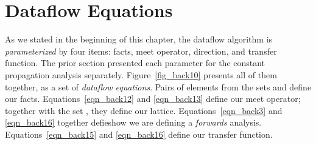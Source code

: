 \documentclass[12pt]{report}
\begin{document}








\section{Dataflow Equations}
\label{back_subsec_eq}

As we stated in the beginning of this chapter, the dataflow algorithm
is \emph{parameterized} by four items: facts, meet operator,
direction, and transfer function. The prior section presented each
parameter for the constant propagation analysis
separately. Figure~\ref{fig_back10} presents all of them together, as
a set of \emph{dataflow equations}. Pairs of elements from the sets
\setLC and  define our facts. Equations~\eqref{eqn_back12}
and \eqref{eqn_back13} define our meet operator; together with the set
\setLC, they define our lattice. Equations~\eqref{eqn_back3} and
\eqref{eqn_back16} together defieshow we are defining a \emph{forwards}
  analysis. Equations~\eqref{eqn_back15} and \eqref{eqn_back16} define
our transfer function.
\end{document}
